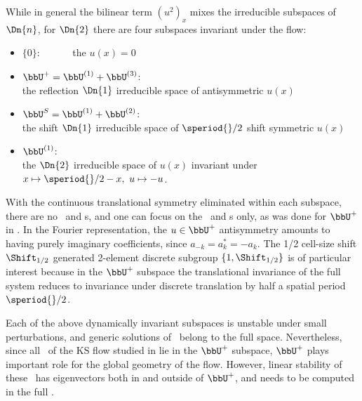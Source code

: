 While in general the bilinear term $(u^2)_x$  mixes the
irreducible subspaces of $\Dn{n}$, for $\Dn{2}$ there are
four subspaces invariant under the flow:
\begin{itemize} %
 \item
    $\{0\}$:~~~~~~ the $u(x)=0$ {\eqv}
 \item
    $\bbU^+ = \bbU^{(1)}+ \bbU^{(3)} $:\\
    the reflection $\Dn{1}$ irreducible space of antisymmetric $u(x)$
 \item
    $\bbU^S =  \bbU^{(1)}+ \bbU^{(2)}$:\\
    the shift $\Dn{1}$ irreducible space of $\speriod{}/2$ shift symmetric  $u(x)$
 \item
    $\bbU^{(1)}$:~~~~~\\
    the $\Dn{2}$ irreducible  space of $u(x)$ invariant under
    $x\mapsto \speriod{}/2-x,\ u\mapsto -u$.
\end{itemize} %
With the continuous
translational symmetry eliminated within each subspace, there are no
\reqva\ and \rpo s, and one
can focus on the \eqva\ and \po s only, as was done
for $\bbU^+$ in .
In the Fourier
representation, the
$u \in \bbU^+$
antisymmetry amounts to having purely imaginary
coefficients, since $a_{-k}= a^\ast_k = -a_k$.
The 1/2 cell-size shift $\Shift_{1/2}$
generated 2-element discrete subgroup
$\{1,\Shift_{1/2}\}$ is
of particular interest
because in the $\bbU^+$ subspace the translational invariance of the full system reduces to
invariance under discrete translation  by half a
spatial period $\speriod{}/2$.

Each of the above dynamically invariant subspaces is unstable
under small perturbations, and generic solutions of \KSe\ belong to
the full space.
Nevertheless, since  all \eqva\ of the KS flow studied in 
lie in the $\bbU^+$ subspace, $\bbU^+$  plays important role for the global
geometry of the flow.
However, linear stability of these \eqva\ has
eigenvectors both in and outside of $\bbU^+$, and needs to be
computed in the full \statesp.
